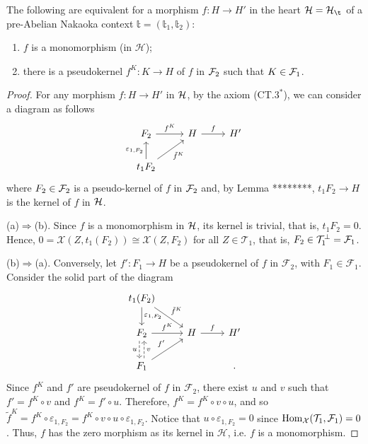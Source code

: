 \begin{prop}\label{prop:1.4}
The following are equivalent for a morphism $f\colon H\to H'$ in the heart $\H=\H_\t$ of a pre-Abelian Nakaoka context $\mathbb{t}=(\mathbb{t}_1,\mathbb{t}_2)$:
\begin{enumerate}[label=(\alph*)]
\item $f$ is a monomorphism (in $\mathcal{H}$);
\item there is a pseudokernel $f^K\colon K\to H$ of $f$ in $\mathcal F_2$ such that $K\in \mathcal F_1$. 
\end{enumerate}
\end{prop}
\begin{proof}
For any morphism $f\colon H\to H'$ in $\mathcal H$, by the axiom (CT.$3^*$), we can consider a diagram as follows
\begin{equation*}
\begin{tikzcd}
F_2\arrow{r}{f^K} & H\arrow{r}{f} & H'\\
t_1{F_2}\arrow{u}{\varepsilon_{1,F_2}}\arrow{ur}[']{\tilde{f}^K}
\end{tikzcd}
\end{equation*}
where $F_2\in \mathcal F_2$ is a pseudo-kernel of $f$ in $\mathcal F_2$ and, by Lemma ********, $t_1F_2\to H$ is the kernel of $f$ in $\mathcal H$.

\smallskip\noindent
(a)$\Rightarrow$(b). Since $f$ is a monomorphism in $\mathcal H$, its kernel is trivial, that is, $t_1F_2=0$. Hence, $0=\mathcal{X}(Z,t_1(F_2))\cong \mathcal{X}(Z,F_2)$ for all $Z\in\mathcal{T}_1$, that is, $F_2\in\mathcal T_1^{\perp}=\mathcal{F}_1$.

\smallskip\noindent
(b)$\Rightarrow$(a). Conversely, let $f':F_1\to H$ be a pseudokernel of $f$ in $\mathcal{F}_2$, with $F_1\in\mathcal{F}_1$. Consider the solid part of the diagram
\begin{equation*}
\begin{tikzcd}
t_1(F_2)\arrow{d}{\varepsilon_{1,F_2}}\arrow{dr}{\tilde{f}^K} & &\\
F_2\arrow[dashed,shift right]{d}[']{u}\arrow{r}{f^K} & H\arrow{r}{f} & H'\\
F_1\arrow[dashed,shift right]{u}[']{v}\arrow{ur}{f'} & &.
\end{tikzcd}
\end{equation*}
Since $f^K$ and $f'$ are pseudokernel of $f$ in $\mathcal{F}_2$, there exist $u$ and $v$ such that $f'=f^K\circ v$ and $f^K=f'\circ u$. Therefore, $f^K=f^K\circ v\circ u$, and so $\tilde{f}^K=f^K\circ\varepsilon_{1,F_2}=f^K\circ v\circ u\circ\varepsilon_{1,F_2}$. Notice that $u\circ \varepsilon_{1,F_2}=0$ since $\mathrm{Hom}_{\mathcal{X}}(\mathcal{T}_1,\mathcal{F}_1)=0$. Thus, $f$ has the zero morphism as its kernel in $\mathcal{H}$, i.e. $f$ is a monomorphism.
\end{proof}






